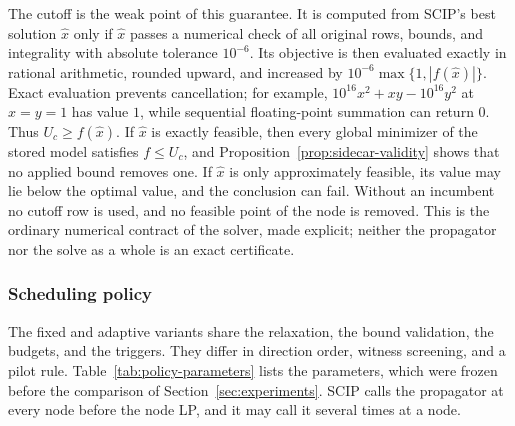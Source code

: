 The cutoff is the weak point of this guarantee. It is computed from SCIP's best
solution $\hat x$ only if $\hat x$ passes a numerical check of all original
rows, bounds, and integrality with absolute tolerance $10^{-6}$. Its objective
is then evaluated exactly in rational arithmetic, rounded upward, and increased
by $10^{-6}\max\{1,|f(\hat x)|\}$. Exact evaluation prevents cancellation; for
example, $10^{16}x^2+xy-10^{16}y^2$ at $x=y=1$ has value $1$, while sequential
floating-point summation can return $0$. Thus $U_c\ge f(\hat x)$. If $\hat x$
is exactly feasible, then every global minimizer of the stored model satisfies
$f\le U_c$, and Proposition~\ref{prop:sidecar-validity} shows that no applied
bound removes one. If $\hat x$ is only approximately feasible, its value may lie
below the optimal value, and the conclusion can fail. Without an incumbent no
cutoff row is used, and no feasible point of the node is removed. This is the
ordinary numerical contract of the solver, made explicit; neither the
propagator nor the solve as a whole is an exact certificate.

\subsubsection{Scheduling policy}

The fixed and adaptive variants share the relaxation, the bound validation,
the budgets, and the triggers. They differ in direction order, witness
screening, and a pilot rule. Table~\ref{tab:policy-parameters} lists the
parameters, which were frozen before the comparison of
Section~\ref{sec:experiments}. SCIP calls the propagator at every node before
the node LP, and it may call it several times at a node.

